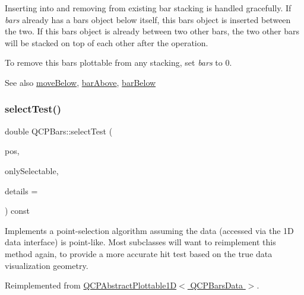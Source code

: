 Inserting into and removing from existing bar stacking is handled gracefully. If {\itshape bars} already has a bars object below itself, this bars object is inserted between the two. If this bars object is already between two other bars, the two other bars will be stacked on top of each other after the operation.

To remove this bars plottable from any stacking, set {\itshape bars} to 0.

\begin{DoxySeeAlso}{See also}
\hyperlink{class_q_c_p_bars_a69fc371346980f19177c3d1ecdad78ee}{move\+Below}, \hyperlink{class_q_c_p_bars_ab97f2acd9f6cb40d2cc3c33d278f0e78}{bar\+Above}, \hyperlink{class_q_c_p_bars_a1b58664864b141f45e02044a855b3213}{bar\+Below} 
\end{DoxySeeAlso}
\mbox{\label{class_q_c_p_bars_a121f899c27af3186fe93dcd0eb98f49b}} 
\subsubsection{\texorpdfstring{select\+Test()}{selectTest()}}
{\footnotesize\ttfamily double Q\+C\+P\+Bars\+::select\+Test (\begin{DoxyParamCaption}\item[{const Q\+PointF \&}]{pos,  }\item[{bool}]{only\+Selectable,  }\item[{Q\+Variant $\ast$}]{details = {} }\end{DoxyParamCaption}) const\hspace{0.3cm}{\ttfamily [virtual]}}

Implements a point-\/selection algorithm assuming the data (accessed via the 1D data interface) is point-\/like. Most subclasses will want to reimplement this method again, to provide a more accurate hit test based on the true data visualization geometry.

Reimplemented from \hyperlink{class_q_c_p_abstract_plottable1_d_a4611b43bcb6441b2154eb4f4e0a33db2}{Q\+C\+P\+Abstract\+Plottable1\+D$<$ Q\+C\+P\+Bars\+Data $>$}.

\mbox{\label{class_q_c_p_bars_ab03bb6125c3e983b89d694f75ce6b3d5}} 
